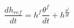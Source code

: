 \begin{equation}
\frac{dh_{ref}}{dt} = h^f \frac{\theta^f }{dt} + h^ \frac{\theta^f }{dt}
\end{equation}